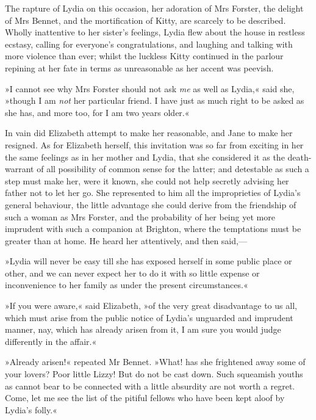 The rapture of Lydia on this occasion, her adoration of Mrs Forster, the delight of Mrs Bennet, and the mortification of Kitty, are scarcely to be described. Wholly inattentive to her sister's feelings, Lydia flew about the house in restless ecstasy, calling for everyone's congratulations, and laughing and talking with more violence than ever; whilst the luckless Kitty continued in the parlour repining at her fate in terms as unreasonable as her accent was peevish.

»I cannot see why Mrs Forster should not ask \textit{me} as well as Lydia,« said she, »though I am \textit{not} her particular friend. I have just as much right to be asked as she has, and more too, for I am two years older.«

In vain did Elizabeth attempt to make her reasonable, and Jane to make her resigned. As for Elizabeth herself, this invitation was so far from exciting in her the same feelings as in her mother and Lydia, that she considered it as the death-warrant of all possibility of common sense for the latter; and detestable as such a step must make her, were it known, she could not help secretly advising her father not to let her go. She represented to him all the improprieties of Lydia's general behaviour, the little advantage she could derive from the friendship of such a woman as Mrs Forster, and the probability of her being yet more imprudent with such a companion at Brighton, where the temptations must be greater than at home. He heard her attentively, and then said,—

»Lydia will never be easy till she has exposed herself in some public place or other, and we can never expect her to do it with so little expense or inconvenience to her family as under the present circumstances.«

»If you were aware,« said Elizabeth, »of the very great disadvantage to us all, which must arise from the public notice of Lydia's unguarded and imprudent manner, nay, which has already arisen from it, I am sure you would judge differently in the affair.«

»Already arisen!« repeated Mr Bennet. »What! has she frightened away some of your lovers? Poor little Lizzy! But do not be cast down. Such squeamish youths as cannot bear to be connected with a little absurdity are not worth a regret. Come, let me see the list of the pitiful fellows who have been kept aloof by Lydia's folly.«

